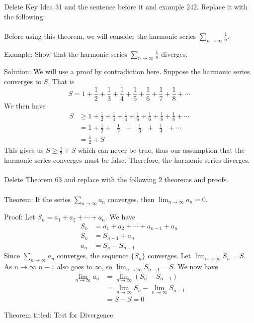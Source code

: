 \documentclass[10pt]{article}
\newcommand{\ds}{\displaystyle}
\begin{document}
Delete Key Idea 31 and the sentence before it and example 242. Replace it with the following:\\ \\

Before using this theorem, we will consider the harmonic series $\ds \sum_{n\to \infty} \frac{1}{n}$.

Example:  Show that the harmonic series $\ds \sum_{n\to \infty} \frac{1}{n}$ diverges.

Solution:   We will use a proof by contradiction here. Suppose the harmonic series converges to $S$. That is $$S=1+\frac12+ \frac13 +\frac14+\frac15+\frac16+\frac17+\frac18+\cdots$$
We then have
\begin{align*}
S &\geq 1+\frac12+\frac14+\frac14+\frac16+\frac16+\frac18+\frac18+\cdots\\
&=1+\frac12+~~~\frac12~~~ +~~~\frac13~~~+~~~\frac14~~~+\cdots\\
&=\frac12+S
\end{align*}
This gives us $S\geq \frac12+S$ which can never be true, thus our assumption that the harmonic series converges must be false. Therefore, the harmonic series diverges.   \\ \\

Delete Theorem 63 and replace with the following 2 theorems and proofs. \\ \\ 

Theorem:  If the series $\ds \sum_{n\to\infty}a_n$ converges, then $\lim_{n\to\infty}a_n=0$.

Proof:  Let $S_n=a_1+a_2+\cdots+a_n$. We have 
\begin{align*}
S_n&=a_1+a_2+\cdots+a_{n-1}+a_n\\
S_n&=S_{n-1}+a_n\\
a_n&=S_n-S_{n-1}
\end{align*}
Since  $\ds \sum_{n\to\infty}a_n$ converges, the sequence $\{ S_n\}$ converges.  Let $\ds \lim_{n\to\infty} S_n=S$. As $n\to \infty$ $n-1$ also goes to $\infty$, so $\ds \lim_{n\to\infty} S_{n-1}=S$. We now have
\begin{align*}
\lim_{n\to\infty} a_n&= \lim_{n\to\infty}(S_n-S_{n-1})\\
&= \lim_{n\to\infty}S_n - \lim_{n\to\infty} S_{n-1}\\
&=S-S=0
\end{align*}


Theorem titled:  Test for Divergence
\end{document}
